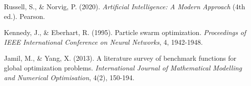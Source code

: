 \documentclass[letterpaper]{article}
\begin{document}
\begin{thebibliography}{9}

Russell, S., \& Norvig, P. (2020).
\textit{Artificial Intelligence: A Modern Approach} (4th ed.).
Pearson.

Kennedy, J., \& Eberhart, R. (1995).
Particle swarm optimization.
\textit{Proceedings of IEEE International Conference on Neural Networks}, 4, 1942-1948.

Jamil, M., \& Yang, X. (2013).
A literature survey of benchmark functions for global optimization problems.
\textit{International Journal of Mathematical Modelling and Numerical Optimisation}, 4(2), 150-194.

\end{thebibliography}
\end{document}
